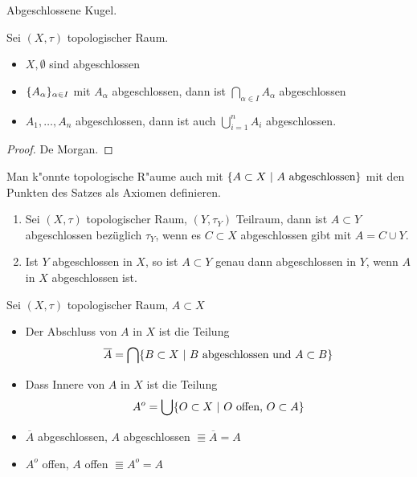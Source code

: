 \begin{bsp}
    Abgeschlossene Kugel.
\end{bsp}

\begin{stz}[Dualsatz]
    Sei $(X,\tau)$ topologischer Raum.
    \begin{itemize}
     \item $X, \emptyset$ sind abgeschlossen
     \item $\mdef{A_\alpha}_{\alpha\in I}$ mit $A_\alpha$ abgeschlossen, dann ist
        $\bigcap_{\alpha\in I} A_\alpha$ abgeschlossen
     \item $A_1,\ldots, A_n$ abgeschlossen, dann ist auch $\bigcup_{i=1}^n A_i$
        abgeschlossen.
    \end{itemize}
    \begin{proof}
        De Morgan.
    \end{proof}
    \begin{bem}
        Man k"onnte topologische R"aume auch mit $\mdef[A\subset X]{A\text{ abgeschlossen}}$
        mit den Punkten des Satzes als Axiomen definieren.
    \end{bem}
\end{stz}

\begin{lem}
   \begin{enumerate}
    \item Sei $(X,\tau)$ topologischer Raum, $(Y,\tau_Y)$ Teilraum, dann ist
        $A\subset Y$ abgeschlossen bezüglich $\tau_Y$, wenn es $C\subset X$
        abgeschlossen gibt mit $A=C\cup Y$.
    \item Ist $Y$ abgeschlossen in $X$, so ist $A\subset Y$ genau dann abgeschlossen
        in $Y$, wenn $A$ in $X$ abgeschlossen ist.
   \end{enumerate}
\end{lem}

\begin{dfn}
    Sei $(X,\tau)$ topologischer Raum, $A\subset X$
    \begin{itemize}
        \item Der Abschluss von $A$ in $X$ ist die Teilung
            \[\overline{A} = \bigcap\mdef[B\subset X]{B \text{ abgeschlossen und }
              A\subset B}\]
        \item Dass Innere von $A$ in $X$ ist die Teilung
            \[A^o = \bigcup\mdef[O\subset X]{O\text{ offen, } O\subset A}\]
    \end{itemize}
    \begin{bem}
        \begin{itemize}
            \item $\overline{A}$ abgeschlossen, $A$ abgeschlossen $\Equiv
                \overline{A} = A$
            \item $A^o$ offen, $A$ offen $\Equiv A^o = A$
        \end{itemize}
    \end{bem}
\end{dfn}


